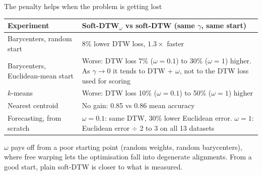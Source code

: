\documentclass[aspectratio=169,11pt]{beamer}
\begin{document}
\begin{frame}{The penalty helps when the problem is getting lost}
\small
\begin{tabular}{p{}p{}}
\toprule
Experiment & Soft-DTW$_\omega$ vs soft-DTW (same $\gamma$, same start)\\
\midrule
Barycenters, random start & 8\% lower DTW loss, $1.3\times$ faster\\
Barycenters, Euclidean-mean start & Worse: DTW loss 7\% ($\omega=0.1$) to 30\% ($\omega=1$) higher. As $\gamma\to0$ it tends to DTW + $\omega$, not to the DTW loss used for scoring\\
$k$-means & Worse: DTW loss 10\% ($\omega=0.1$) to 50\% ($\omega=1$) higher\\
Nearest centroid & No gain: 0.85 vs 0.86 mean accuracy\\
Forecasting, from scratch & $\omega=0.1$: same DTW, 30\% lower Euclidean error. $\omega=1$: Euclidean error $\div$ 2 to 3 on all 13 datasets\\
\bottomrule
\end{tabular}
\vspace{0.5cm}
\begin{block}{}
$\omega$ pays off from a poor starting point (random weights, random barycenters), where free warping lets the optimisation fall into degenerate alignments. From a good start, plain soft-DTW is closer to what is measured.
\end{block}
\end{frame}
\end{document}
